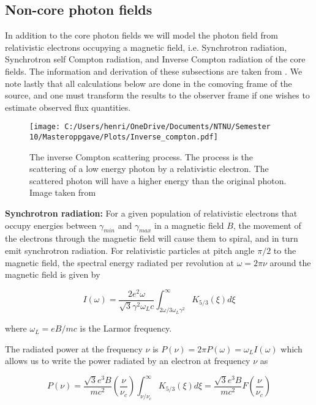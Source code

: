 \subsection{Non-core photon fields}
\label{sec:non_core_photon_fields}
In addition to the core photon fields we will model the photon field from relativistic electrons occupying a magnetic field, i.e. Synchrotron radiation, Synchrotron self Compton radiation, and Inverse Compton radiation of the core fields. The information and derivation of these subsections are taken from \cite{BHradiation}. We note lastly that all calculations below are done in the comoving frame of the source, and one must transform the results to the observer frame if one wishes to estimate observed flux quantities.

\begin{figure}
    \centering
    \texttt{[image: C:/Users/henri/OneDrive/Documents/NTNU/Semester 10/Masteroppgave/Plots/Inverse\_compton.pdf]}
    \caption{The inverse Compton scattering process. The process is the scattering of a low energy photon by a relativistic electron. The scattered photon will have a higher energy than the original photon. Image taken from \cite{BennumAlfred}}
\end{figure}

\textbf{Synchrotron radiation:} 
\label{sec:synchrotron_radiation}
For a given population of relativistic electrons that occupy energies between $\gamma_{min}$ and $\gamma_{max}$ in a magnetic field $B$, the movement of the electrons through the magnetic field will cause them to spiral, and in turn emit synchrotron radiation. For relativistic particles at pitch angle $\pi/2$ to the magnetic field, the spectral energy radiated per revolution at $\omega = 2\pi \nu$ around the magnetic field is given by

\begin{equation}
    I(\omega) = \frac{2 e^2 \omega}{\sqrt{3}\gamma^2 \omega_L c} \int_{2\omega/3\omega_L\gamma^2 }^{\infty} K_{5/3}(\xi)d\xi  
\end{equation}

where $\omega_L = eB/mc$ is the Larmor frequency.

The radiated power at the frequency $\nu$ is $P(\nu) = 2\pi P(\omega) = \omega_L I(\omega)$ which allows us to write the power radiated by an electron at frequency $\nu$ as

\begin{equation}
    P(\nu) = \frac{\sqrt{3} e^3 B}{m c^2} \left(\frac{\nu}{\nu_c}\right) \int_{\nu/\nu_c}^{\infty} K_{5/3}(\xi)d\xi = \frac{\sqrt{3} e^3 B}{m c^2} F\left(\frac{\nu}{\nu_c}\right)
\end{equation}


